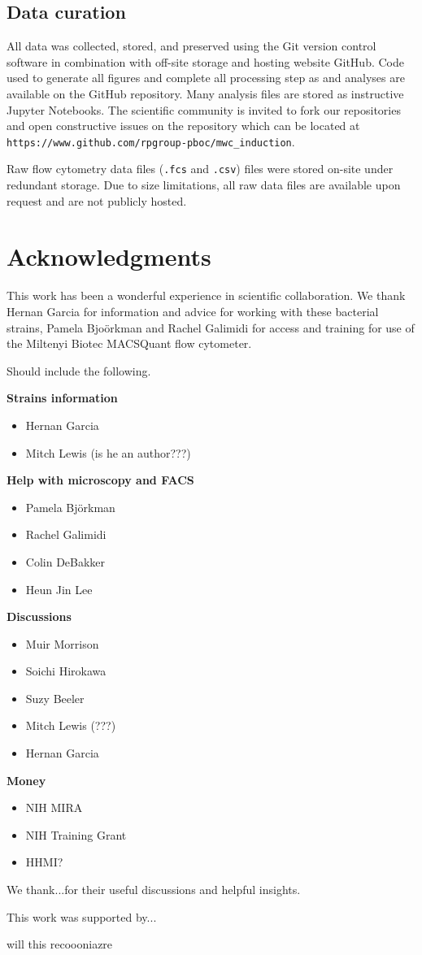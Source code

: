 \subsection*{Data curation}
All data was collected, stored, and preserved using the Git version control
software in combination with off-site storage and hosting website GitHub. Code
used to generate all figures and complete all processing step as and analyses
are available on the GitHub repository. Many analysis files are stored as
instructive Jupyter Notebooks. The scientific community is invited to fork our
repositories and open constructive issues on the repository which can be
located at \texttt{https://www.github.com/rpgroup-pboc/mwc\_induction}.

Raw flow cytometry data files (\texttt{.fcs} and \texttt{.csv}) files were
stored on-site under redundant storage. Due to size limitations, all raw data
files are available upon request and are not publicly hosted.

\section*{Acknowledgments}
This work has been a wonderful experience in scientific collaboration. We thank
Hernan Garcia for information and advice for working with these bacterial
strains, Pamela Bjo\"{o}rkman and Rachel Galimidi for access and training for
use of the Miltenyi Biotec MACSQuant flow cytometer.

Should include the following.

\textbf{Strains information}
\begin{itemize}
\item{Hernan Garcia}
\item{Mitch Lewis (is he an author???)}
\end{itemize}


\textbf{Help with microscopy and FACS}
\begin{itemize}
\item{Pamela Bj\"orkman}
\item{Rachel Galimidi}
\item{Colin DeBakker}
\item{Heun Jin Lee}
\end{itemize}

\textbf{Discussions}
\begin{itemize}
\item{Muir Morrison}
\item{Soichi Hirokawa}
\item{Suzy Beeler}
\item{Mitch Lewis (???)}
\item{Hernan Garcia}
\end{itemize}

\textbf{Money}
\begin{itemize}
\item{NIH MIRA}
\item{NIH Training Grant}
\item{HHMI?}
\end{itemize}
We thank...for their useful discussions and helpful insights.

This work was supported by...

will this recoooniazre
